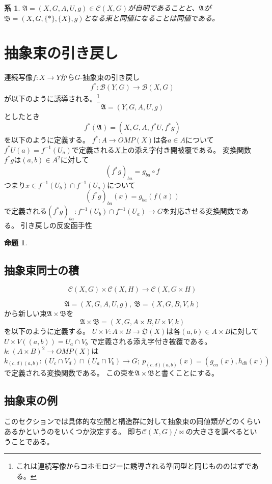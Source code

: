 \documentclass[leqno]{jsarticle}
\newtheorem{prop}[thm]{命題}
\newtheorem{cor}[thm]{系}
\begin{document}
\begin{cor}
$\mathfrak{A}=(X, G, A, U, g)\in \mathscr{C}(X,G)$が自明であることと、$\mathfrak{A}$が$\mathfrak{B}=(X, G, \{*\}, \{X\}, g)$となる束と同値になることは同値である。
\end{cor}


\section{抽象束の引き戻し}
連続写像$f:X\to Y$から$G$-抽象束の引き戻し
\[
f^{*}:\mathscr{B}(Y,G)\to \mathscr{B}(X,G)
\]
が以下のように誘導される。\footnote{これは連続写像からコホモロジーに誘導される準同型と同じもののはずである。}
\[
\mathfrak{A}=(Y, G, A, U, g)
\]
としたとき
\[
f^{*}(\mathfrak{A})=(X, G, A, f^{*}U, f^{*}g)
\]
を以下のように定義する。
$f^{*}:A\to OMP(X)$は各$a\in A$について$f^{*}U(a)=f^{-1}(U_a)$で定義される$X$上の添え字付き開被覆である。
変換関数$f^{*}g$は$(a,b)\in A^2$に対して
\[
(f^{*}g)_{ba}=g_{ba}\circ f
\]
つまり$x\in f^{-1}(U_b)\cap f^{-1}(U_a)$について
\[
(f^{*}g)_{ba}(x)=g_{ba}(f(x))
\]
で定義される$(f^{*}g)_{ba}:f^{-1}(U_b)\cap f^{-1}(U_a)\to G$を対応させる変換関数である。
引き戻しの反変函手性
\begin{prop}

\end{prop}
\subsection{抽象束同士の積}
\[
\mathscr{C}(X,G)\times \mathscr{C}(X,H)\to \mathscr{C}(X, G\times H)
\]

\[
\mathfrak{A}=(X, G, A, U, g),\ \mathfrak{B}=(X, G, B, V, h)
\]
から新しい束$\mathfrak{A}\times \mathfrak{B}$を
\[
\mathfrak{A}\times \mathfrak{B}=(X, G, A\times B, U\times V, k)
\]
を以下のように定義する。
$U\times V: A\times B\to \mathfrak{O}(X)$は各$(a, b)\in A\times B$に対して$U\times V((a, b))=U_a\cap V_b$
で定義される添え字付き被覆である。
$k:(A\times B)^2\to OMP(X)$は
\[
k_{(c,d)(a,b)}:(U_c\cap V_d)\cap (U_a\cap V_b)\to G;\  p_{(c,d)(a,b)}(x)=(g_{ca}(x), h_{db}(x))
\]
で定義される変換関数である。
この束を$\mathfrak{A}\times \mathfrak{B}$と書くことにする。
\subsection{抽象束の例}
このセクションでは具体的な空間と構造群に対して抽象束の同値類がどのくらいあるかというのをいくつか決定する。
即ち$\mathscr{C}(X,G)/\!\bowtie$の大きさを調べるということである。
\end{document}
